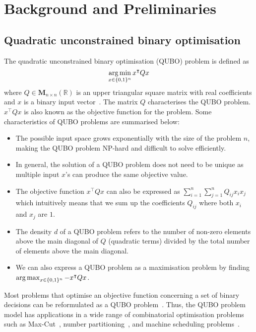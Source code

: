 
\chapter{Background and Preliminaries}
\vspace{2em}

\section{Quadratic unconstrained binary optimisation}
The quadratic unconstrained binary optimisation (QUBO) problem is defined as
\begin{equation} 
\operatorname*{arg\,min}_{x \in \{0, 1\}^n} x^\intercal Q x
\end{equation}
where $Q \in \boldsymbol{M}_{n\times n}(\mathbb{R})$ is an upper triangular square matrix with real coefficients and $x$ is a binary input vector~\cite{b1}. The matrix $Q$ characterises the QUBO problem. $x^\intercal Q x$ is also known as the objective function for the problem. Some characteristics of QUBO problems are summarised below:
\begin{itemize}
    \item The possible input space grows exponentially with the size of the problem $n$, making the QUBO problem NP-hard and difficult to solve efficiently.
    \item In general, the solution of a QUBO problem does not need to be unique as multiple input $x$'s can produce the same objective value.
    \item The objective function $x^\intercal Q x$ can also be expressed as $\sum_{i=1}^{n}\sum_{j=1}^{n} Q_{ij}x_{i}x_{j}$ which intuitively means that we sum up the coefficients $Q_{ij}$ where both $x_{i}$ and $x_{j}$ are $1$.
    \item The density $d$ of a QUBO problem refers to the number of non-zero elements above the main diagonal of $Q$ (quadratic terms) divided by the total number of elements above the main diagonal. 
    \item We can also express a QUBO problem as a maximisation problem by finding $\operatorname*{arg\,max}_{x \in \{0, 1\}^n} -x^\intercal Q x$.
\end{itemize}

Most problems that optimise an objective function concerning a set of binary decisions can be reformulated as a QUBO problem~\cite{b5}. Thus, the QUBO problem model has applications in a wide range of combinatorial optimisation problems such as Max-Cut~\cite{b2}, number partitioning~\cite{b3}, and machine scheduling problems~\cite{b4}. 


